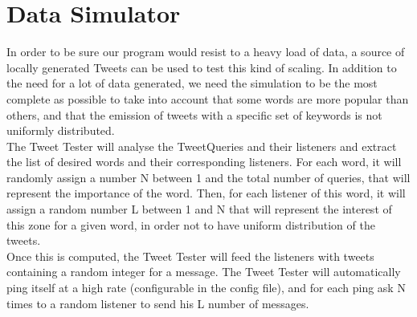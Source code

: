 \section{Data Simulator}
In order to be sure our program would resist to a heavy load of data, a source of locally generated Tweets can be used to test this kind of scaling. In addition to the need for a lot of data generated, we need the simulation to be the most complete as possible to take into account that some words are more popular than others, and that the emission of tweets with a specific set of keywords is not uniformly distributed. \\
The Tweet Tester will analyse the TweetQueries and their listeners and extract the list of desired words and their corresponding listeners. For each word, it will randomly assign a number N between 1 and the total number of queries, that will represent the importance of the word. Then, for each listener of this word, it will assign a random number L between 1 and N that will represent the interest of this zone for a given word, in order not to have uniform distribution of the tweets.\\
Once this is computed, the Tweet Tester will feed the listeners with tweets containing a random integer for a message. The Tweet Tester will automatically ping itself at a high rate (configurable in the config file), and for each ping ask N times to a random listener to send his L number of messages.
